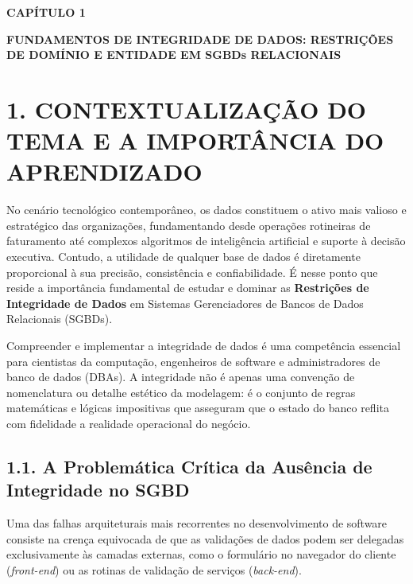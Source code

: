 
\begin{center}
\textbf{\fontsize{14}{16}\selectfont CAPÍTULO 1}

\vspace{0.5em}

\textbf{\fontsize{14}{16}\selectfont FUNDAMENTOS DE INTEGRIDADE DE DADOS: RESTRIÇÕES DE DOMÍNIO E ENTIDADE EM SGBDs RELACIONAIS}
\end{center}

\vspace{1.5em}

\section*{1. CONTEXTUALIZAÇÃO DO TEMA E A IMPORTÂNCIA DO APRENDIZADO}

No cenário tecnológico contemporâneo, os dados constituem o ativo mais valioso e estratégico das organizações, fundamentando desde operações rotineiras de faturamento até complexos algoritmos de inteligência artificial e suporte à decisão executiva. Contudo, a utilidade de qualquer base de dados é diretamente proporcional à sua precisão, consistência e confiabilidade. É nesse ponto que reside a importância fundamental de estudar e dominar as \textbf{Restrições de Integridade de Dados} em Sistemas Gerenciadores de Bancos de Dados Relacionais (SGBDs).

Compreender e implementar a integridade de dados é uma competência essencial para cientistas da computação, engenheiros de software e administradores de banco de dados (DBAs). A integridade não é apenas uma convenção de nomenclatura ou detalhe estético da modelagem: é o conjunto de regras matemáticas e lógicas impositivas que asseguram que o estado do banco reflita com fidelidade a realidade operacional do negócio.

\subsection*{1.1. A Problemática Crítica da Ausência de Integridade no SGBD}

Uma das falhas arquiteturais mais recorrentes no desenvolvimento de software consiste na crença equivocada de que as validações de dados podem ser delegadas exclusivamente às camadas externas, como o formulário no navegador do cliente (\textit{front-end}) ou as rotinas de validação de serviços (\textit{back-end}).

